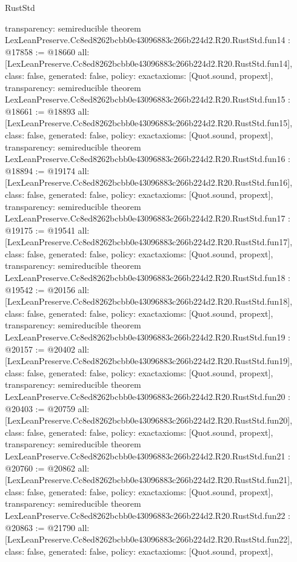 \begin{lexlean}{RustStd}
\begin{coremodule}
{  transparency: semireducible
}
theorem LexLeanPreserve.Cc8ed8262bcbb0e43096883c266b224d2.R20.RustStd.fun14 : @17858 := @18660 {
  all: [LexLeanPreserve.Cc8ed8262bcbb0e43096883c266b224d2.R20.RustStd.fun14],
  class: false,
  generated: false,
  policy: exact{axioms: [Quot.sound, propext]},
  transparency: semireducible
}
theorem LexLeanPreserve.Cc8ed8262bcbb0e43096883c266b224d2.R20.RustStd.fun15 : @18661 := @18893 {
  all: [LexLeanPreserve.Cc8ed8262bcbb0e43096883c266b224d2.R20.RustStd.fun15],
  class: false,
  generated: false,
  policy: exact{axioms: [Quot.sound, propext]},
  transparency: semireducible
}
theorem LexLeanPreserve.Cc8ed8262bcbb0e43096883c266b224d2.R20.RustStd.fun16 : @18894 := @19174 {
  all: [LexLeanPreserve.Cc8ed8262bcbb0e43096883c266b224d2.R20.RustStd.fun16],
  class: false,
  generated: false,
  policy: exact{axioms: [Quot.sound, propext]},
  transparency: semireducible
}
theorem LexLeanPreserve.Cc8ed8262bcbb0e43096883c266b224d2.R20.RustStd.fun17 : @19175 := @19541 {
  all: [LexLeanPreserve.Cc8ed8262bcbb0e43096883c266b224d2.R20.RustStd.fun17],
  class: false,
  generated: false,
  policy: exact{axioms: [Quot.sound, propext]},
  transparency: semireducible
}
theorem LexLeanPreserve.Cc8ed8262bcbb0e43096883c266b224d2.R20.RustStd.fun18 : @19542 := @20156 {
  all: [LexLeanPreserve.Cc8ed8262bcbb0e43096883c266b224d2.R20.RustStd.fun18],
  class: false,
  generated: false,
  policy: exact{axioms: [Quot.sound, propext]},
  transparency: semireducible
}
theorem LexLeanPreserve.Cc8ed8262bcbb0e43096883c266b224d2.R20.RustStd.fun19 : @20157 := @20402 {
  all: [LexLeanPreserve.Cc8ed8262bcbb0e43096883c266b224d2.R20.RustStd.fun19],
  class: false,
  generated: false,
  policy: exact{axioms: [Quot.sound, propext]},
  transparency: semireducible
}
theorem LexLeanPreserve.Cc8ed8262bcbb0e43096883c266b224d2.R20.RustStd.fun20 : @20403 := @20759 {
  all: [LexLeanPreserve.Cc8ed8262bcbb0e43096883c266b224d2.R20.RustStd.fun20],
  class: false,
  generated: false,
  policy: exact{axioms: [Quot.sound, propext]},
  transparency: semireducible
}
theorem LexLeanPreserve.Cc8ed8262bcbb0e43096883c266b224d2.R20.RustStd.fun21 : @20760 := @20862 {
  all: [LexLeanPreserve.Cc8ed8262bcbb0e43096883c266b224d2.R20.RustStd.fun21],
  class: false,
  generated: false,
  policy: exact{axioms: [Quot.sound, propext]},
  transparency: semireducible
}
theorem LexLeanPreserve.Cc8ed8262bcbb0e43096883c266b224d2.R20.RustStd.fun22 : @20863 := @21790 {
  all: [LexLeanPreserve.Cc8ed8262bcbb0e43096883c266b224d2.R20.RustStd.fun22],
  class: false,
  generated: false,
  policy: exact{axioms: [Quot.sound, propext]},
}
\end{coremodule}
\end{lexlean}
